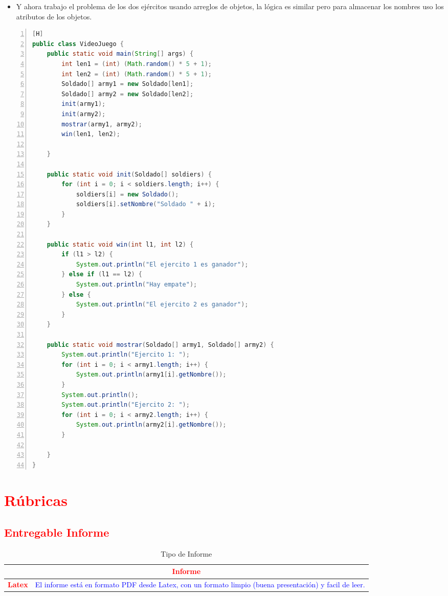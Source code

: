 \documentclass{article}
\begin{document}
	\begin{itemize}
		\item Y ahora trabajo el problema de los dos ejércitos usando arreglos de objetos, la lógica es similar pero para almacenar los nombres uso los atributos de los objetos.
	\end{itemize}
	\begin{lstlisting}[language=java,caption={Los 5 soldados}, numbers=left][H]
public class VideoJuego {
    public static void main(String[] args) {
        int len1 = (int) (Math.random() * 5 + 1);
        int len2 = (int) (Math.random() * 5 + 1);
        Soldado[] army1 = new Soldado[len1];
        Soldado[] army2 = new Soldado[len2];
        init(army1);
        init(army2);
        mostrar(army1, army2);
        win(len1, len2);

    }

    public static void init(Soldado[] soldiers) {
        for (int i = 0; i < soldiers.length; i++) {
            soldiers[i] = new Soldado();
            soldiers[i].setNombre("Soldado " + i);
        }
    }

    public static void win(int l1, int l2) {
        if (l1 > l2) {
            System.out.println("El ejercito 1 es ganador");
        } else if (l1 == l2) {
            System.out.println("Hay empate");
        } else {
            System.out.println("El ejercito 2 es ganador");
        }
    }

    public static void mostrar(Soldado[] army1, Soldado[] army2) {
        System.out.println("Ejercito 1: ");
        for (int i = 0; i < army1.length; i++) {
            System.out.println(army1[i].getNombre());
        }
        System.out.println();
        System.out.println("Ejercito 2: ");
        for (int i = 0; i < army2.length; i++) {
            System.out.println(army2[i].getNombre());
        }

    }
}
	\end{lstlisting}
	
	
	
	\section{\textcolor{red}{Rúbricas}}
	
	\subsection{\textcolor{red}{Entregable Informe}}
	\begin{table}[H]
		\caption{Tipo de Informe}
		\setlength{\tabcolsep}{0.5em} %
		{\renewcommand{\arraystretch}{1.5}%
		\begin{tabular}{|p{3cm}|p{12cm}|}
			\hline
			\multicolumn{2}{|c|}{\textbf{\textcolor{red}{Informe}}}  \\
			\hline 
			\textbf{\textcolor{red}{Latex}} & \textcolor{blue}{El informe está en formato PDF desde Latex,  con un formato limpio (buena presentación) y facil de leer.}   \\ 
			\hline 
			
			
		\end{tabular}
	}
	\end{table}
	
\end{document}
